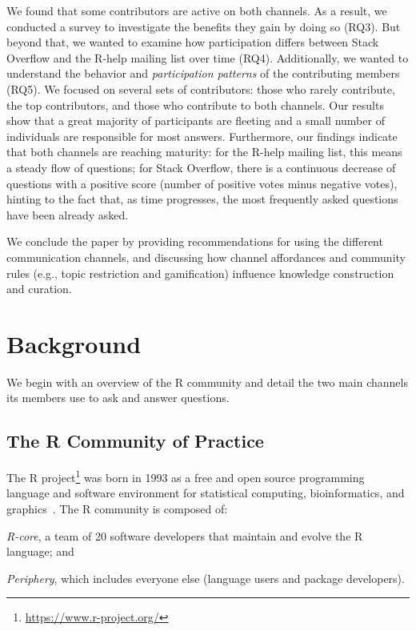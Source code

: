 \documentclass[smallextended]{svjour3}       %
\newcommand{\SO}{Stack Overflow\xspace}
\newcommand{\RH}{R-help\xspace}
\begin{document}
We found that some contributors are active on both channels. As a
result, we conducted a survey to investigate the benefits they gain by
doing so (RQ3). But beyond that, we wanted to examine how participation differs between \SO and the \RH mailing list over time (RQ4). Additionally, we wanted to understand the behavior and \textit{participation patterns} of the contributing members (RQ5). We focused on several sets of contributors: those who rarely contribute,
the top contributors, and those who contribute to both channels. 
Our results show that a great majority of participants are
fleeting and a small number of individuals are responsible for most
answers.  Furthermore, our findings indicate that both channels are reaching
maturity: for the \RH mailing list, this means a steady flow of questions; for \SO, there is a continuous decrease of questions with a positive score
(number of positive votes minus negative votes), hinting to the fact
that, as time progresses, the most frequently asked questions have
been already asked.

We conclude the paper by providing recommendations for
using the different communication channels, and discussing how channel
affordances and community rules (e.g., topic restriction and
gamification) influence knowledge construction and curation.

 \section{Background}
\label{cha:background}
We begin with an overview of the R community and detail the two main channels its members use to ask and answer questions.

\subsection{The R Community of Practice}
    
    The R project\footnote{\url{https://www.r-project.org/}} was born in 1993 as a free and open source programming language and software environment for statistical computing, bioinformatics, and graphics~\cite{Ihaka1996}.
    The R community is composed of:
    \begin{enumerate*}[label=(\arabic*)]
      \item \textit{R-core}, a team of 20 software developers that maintain and evolve the R language; and
      \item \textit{Periphery}, which includes everyone else (language users and package developers).
    \end{enumerate*}
\end{document}
